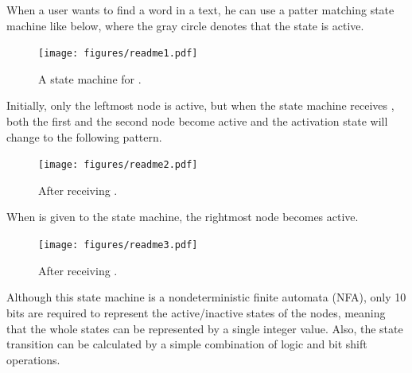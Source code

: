 \documentclass{sigchi}
\begin{document}
When a user wants to find a word  in a text,
he can use a patter matching state machine like below,
where the gray circle denotes that the state is active.

\begin{figure}[h]
\texttt{[image: figures/readme1.pdf]}
\caption{A state machine for .}
\label{readme1}
\end{figure}

Initially, only the leftmost node is active, but when the
state machine receives , both the first and the second node become active
and the activation state will change to the following pattern.

\begin{figure}[h]
\texttt{[image: figures/readme2.pdf]}
\caption{After receiving .}
\label{readme2}
\end{figure}

When  is given to the state machine,
the rightmost node becomes active.

\begin{figure}[h]
\texttt{[image: figures/readme3.pdf]}
\caption{After receiving .}
\label{readme3}
\end{figure}

Although this state machine is a nondeterministic finite automata (NFA),
only 10 bits are required to represent the active/inactive states of the nodes,
meaning that the whole states can be represented by a single integer value.
Also,
the state transition can be calculated by a simple combination of
logic and bit shift operations.
\end{document}

